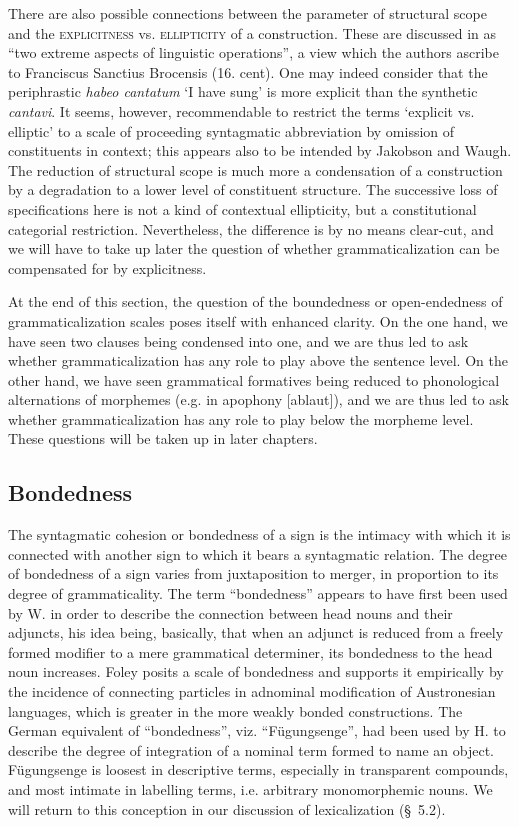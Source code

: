 There are also possible connections between the parameter of structural scope and the \textsc{explicitness} vs. \textsc{ellipticity} of a construction. These are discussed in \citet[6f]{JakobsonEtAl1979} as “two extreme aspects of linguistic operations”, a view which the authors ascribe to Franciscus Sanctius Brocensis (16. cent). One may indeed consider that the periphrastic \textit{habeo cantatum} ‘I have sung’ is more explicit than the synthetic \textit{cantavi}. It seems, however, recommendable to restrict the terms ‘explicit vs. elliptic’ to a scale of proceeding syntagmatic abbreviation by omission of constituents in context; this appears also to be intended by Jakobson and Waugh. The reduction of structural scope is much more a condensation of a construction by a degradation to a lower level of constituent structure. The successive loss of specifications here is not a kind of contextual ellipticity, but a constitutional categorial restriction. Nevertheless, the difference is by no means clear-cut, and we will have to take up later the question of whether grammaticalization can be compensated for by explicitness.

At the end of this section, the question of the boundedness or open-endedness of grammaticalization scales poses itself with enhanced clarity. On the one hand, we have seen two clauses being condensed into one, and we are thus led to ask whether grammaticalization has any role to play above the sentence level. On the other hand, we have seen grammatical formatives being reduced to phonological alternations of morphemes (e.g. in apophony [ablaut]), and we are thus led to ask whether grammaticalization has any role to play below the morpheme level. These questions will be taken up in later chapters.

\subsection{Bondedness}\label{sec:4.3.2}

The syntagmatic cohesion or bondedness of a sign is the intimacy with which it is connected with another sign to which it bears a syntagmatic relation. The degree of bondedness of a sign varies from juxtaposition to merger, in proportion to its degree of grammaticality. The term ``bondedness'' appears to have first been used by W. \citet{Foley1980} in order to describe the connection between head nouns and their adjuncts, his idea being, basically, that when an adjunct is reduced from a freely formed modifier to a mere grammatical determiner, its bondedness to the head noun increases. Foley posits a scale of bondedness and supports it empirically by the incidence of connecting particles in adnominal modification of Austronesian languages, which is greater in the more weakly bonded constructions. The German equivalent of ``bondedness'', viz. ``Fügungsenge'', had been used by H. \citet{Seiler1975} to describe the degree of integration of a nominal term formed to name an object. Fügungsenge is loosest in descriptive terms, especially in transparent compounds, and most intimate in labelling terms, i.e. arbitrary monomorphemic nouns. We will return to this conception in our discussion of lexicalization (§~5.2).


